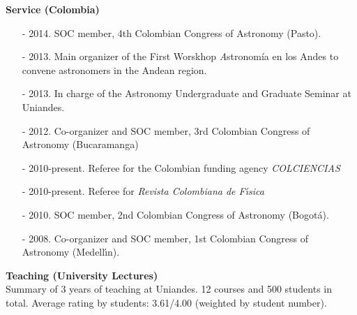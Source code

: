 \documentclass[letterpaper,11pt,onecolumn]{article}
\begin{document}
{\bf Service (Colombia)}
\begin{itemize}

\item[-] 2014. SOC member, 4th Colombian Congress of   Astronomy (Pasto). 
\item[-] 2013. Main organizer of the First Worskhop {\textit Astronom\'ia en
  los Andes} to convene astronomers in the Andean region.  
\item[-] 2013. In charge of the Astronomy Undergraduate and Graduate Seminar at Uniandes. 
\item[-] 2012. Co-organizer and SOC member, 3rd Colombian Congress of
  Astronomy (Bucaramanga) 
\item[-] 2010-present. Referee for the Colombian funding agency {\it
  COLCIENCIAS} %
\item[-] 2010-present. Referee for {\it Revista Colombiana de
  F\'{\i}sica} %
\item[-] 2010. SOC member, 2nd Colombian Congress of Astronomy (Bogot\'a).
\item[-] 2008. Co-organizer and SOC member, 1st Colombian Congress of
  Astronomy (Medell\'{\i}n). 
\end{itemize}


{\bf Teaching (University Lectures)}\\
Summary of 3 years of teaching at Uniandes. 12 courses and 500
students in total. Average rating by students: 3.61/4.00 (weighted by
student number).
\end{document}
